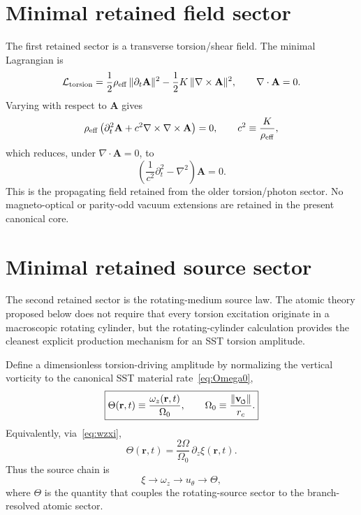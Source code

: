 \documentclass[11pt,a4paper]{article}
\newcommand{\swirlarrow}{\mathchoice{\mkern-2mu\scriptstyle\boldsymbol{\circlearrowleft}}{\mkern-2mu\scriptstyle\boldsymbol{\circlearrowleft}}{\mkern-2mu\scriptscriptstyle\boldsymbol{\circlearrowleft}}{\mkern-2mu\scriptscriptstyle\boldsymbol{\circlearrowleft}}}
\newcommand{\vswirl}{\mathbf{v}_{\swirlarrow}}
\newcommand{\rc}{r_c}
\begin{document}
\section{Minimal retained field sector}
The first retained sector is a transverse torsion/shear field. The minimal Lagrangian is
\begin{equation}
\label{eq:Ltorsion}
\mathcal{L}_{\rm torsion}
=
\frac12\rho_{\rm eff}\,\lVert \partial_t \mathbf{A}\rVert^2
-
\frac12 K\,\lVert \nabla\times\mathbf{A}\rVert^2,
\qquad
\nabla\cdot\mathbf{A}=0.
\end{equation}
Varying with respect to $\mathbf{A}$ gives
\begin{equation}
\label{eq:Awave-pre}
\rho_{\rm eff}\left(\partial_t^2\mathbf{A}+c^2\nabla\times\nabla\times\mathbf{A}\right)=0,
\qquad
c^2\equiv \frac{K}{\rho_{\rm eff}},
\end{equation}
which reduces, under $\nabla\cdot\mathbf{A}=0$, to
\begin{equation}
\label{eq:Awave}
\boxed{
\left(\frac{1}{c^2}\partial_t^2-\nabla^2\right)\mathbf{A}=0.
}
\end{equation}
This is the propagating field retained from the older torsion/photon sector. No magneto-optical or parity-odd vacuum extensions are retained in the present canonical core.

\section{Minimal retained source sector}
The second retained sector is the rotating-medium source law. The atomic theory proposed below does not require that every torsion excitation originate in a macroscopic rotating cylinder, but the rotating-cylinder calculation provides the cleanest explicit production mechanism for an SST torsion amplitude.

Define a dimensionless torsion-driving amplitude by normalizing the vertical vorticity to the canonical SST material rate~\eqref{eq:Omega0},
\begin{equation}
\label{eq:ThetaDef}
\boxed{
\Theta(\mathbf{r},t) \equiv \frac{\omega_z(\mathbf{r},t)}{\Omega_0},
\qquad
\Omega_0\equiv \frac{\lVert\vswirl\rVert}{\rc}.
}
\end{equation}
Equivalently, via~\eqref{eq:wzxi},
\begin{equation}
\label{eq:ThetaXi}
\boxed{
\Theta(\mathbf{r},t)=\frac{2\Omega}{\Omega_0}\,\partial_z\xi(\mathbf{r},t).
}
\end{equation}
Thus the source chain is
\begin{equation}
\label{eq:source-chain}
\xi \longrightarrow \omega_z \longrightarrow u_\theta \longrightarrow \Theta,
\end{equation}
where $\Theta$ is the quantity that couples the rotating-source sector to the branch-resolved atomic sector.
\end{document}
